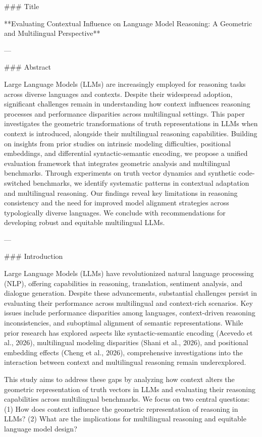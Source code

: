### Title

**Evaluating Contextual Influence on Language Model Reasoning: A Geometric and Multilingual Perspective**

---

### Abstract

Large Language Models (LLMs) are increasingly employed for reasoning tasks across diverse languages and contexts. Despite their widespread adoption, significant challenges remain in understanding how context influences reasoning processes and performance disparities across multilingual settings. This paper investigates the geometric transformations of truth representations in LLMs when context is introduced, alongside their multilingual reasoning capabilities. Building on insights from prior studies on intrinsic modeling difficulties, positional embeddings, and differential syntactic-semantic encoding, we propose a unified evaluation framework that integrates geometric analysis and multilingual benchmarks. Through experiments on truth vector dynamics and synthetic code-switched benchmarks, we identify systematic patterns in contextual adaptation and multilingual reasoning. Our findings reveal key limitations in reasoning consistency and the need for improved model alignment strategies across typologically diverse languages. We conclude with recommendations for developing robust and equitable multilingual LLMs.

---

### Introduction

Large Language Models (LLMs) have revolutionized natural language processing (NLP), offering capabilities in reasoning, translation, sentiment analysis, and dialogue generation. Despite these advancements, substantial challenges persist in evaluating their performance across multilingual and context-rich scenarios. Key issues include performance disparities among languages, context-driven reasoning inconsistencies, and suboptimal alignment of semantic representations. While prior research has explored aspects like syntactic-semantic encoding (Acevedo et al., 2026), multilingual modeling disparities (Shani et al., 2026), and positional embedding effects (Cheng et al., 2026), comprehensive investigations into the interaction between context and multilingual reasoning remain underexplored.

This study aims to address these gaps by analyzing how context alters the geometric representation of truth vectors in LLMs and evaluating their reasoning capabilities across multilingual benchmarks. We focus on two central questions: (1) How does context influence the geometric representation of reasoning in LLMs? (2) What are the implications for multilingual reasoning and equitable language model design?

